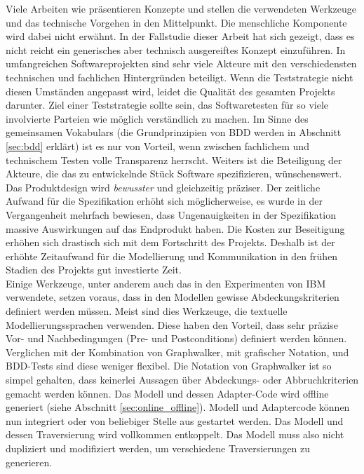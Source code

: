 Viele Arbeiten wie \cite{pretschner_one_2005} \cite{pinheiro_model-based_2013} \cite{sensler_testautomatisierung_2011} präsentieren Konzepte und stellen die verwendeten Werkzeuge und das technische Vorgehen in den Mittelpunkt. Die menschliche Komponente wird dabei nicht erwähnt. In der Fallstudie dieser Arbeit hat sich gezeigt, dass es nicht reicht ein generisches aber technisch ausgereiftes Konzept einzuführen. In umfangreichen Softwareprojekten sind sehr viele Akteure mit den verschiedensten technischen und fachlichen Hintergründen beteiligt. Wenn die Teststrategie nicht diesen Umständen angepasst wird, leidet die Qualität des gesamten Projekts darunter. Ziel einer Teststrategie sollte sein, das Softwaretesten für so viele involvierte Parteien wie möglich verständlich zu machen. Im Sinne des gemeinsamen Vokabulars (die Grundprinzipien von \Gls{BDD} werden in Abschnitt \ref{sec:bdd} erklärt) ist es nur von Vorteil, wenn zwischen fachlichem und technischem Testen volle Transparenz herrscht. Weiters ist die Beteiligung der Akteure, die das zu entwickelnde Stück Software spezifizieren, wünschenswert. Das Produktdesign wird \textit{bewusster} und gleichzeitig präziser. Der zeitliche Aufwand für die Spezifikation erhöht sich möglicherweise, es wurde in der Vergangenheit mehrfach bewiesen, dass Ungenauigkeiten in der Spezifikation massive Auswirkungen auf das Endprodukt haben. Die Kosten zur Beseitigung erhöhen sich drastisch sich mit dem Fortschritt des Projekts. Deshalb ist der erhöhte Zeitaufwand für die Modellierung und Kommunikation in den frühen Stadien des Projekts gut investierte Zeit.\\
Einige Werkzeuge, unter anderem auch das in den Experimenten von IBM \cite{farchi_using_2002} verwendete, setzen voraus, dass in den Modellen gewisse Abdeckungskriterien definiert werden müssen. Meist sind dies Werkzeuge, die textuelle Modellierungssprachen verwenden. Diese haben den Vorteil, dass sehr präzise Vor- und Nachbedingungen (Pre- und Postconditions) definiert werden können. Verglichen mit der Kombination von Graphwalker, mit grafischer Notation, und BDD-Tests sind diese weniger flexibel. Die Notation von Graphwalker ist so simpel gehalten, dass keinerlei Aussagen über Abdeckungs- oder Abbruchkriterien  gemacht werden können. Das Modell und dessen Adapter-Code wird offline generiert (siehe Abschnitt  \ref{sec:online_offline}). Modell und Adaptercode können nun integriert oder von beliebiger Stelle aus gestartet werden. Das Modell und dessen Traversierung wird vollkommen entkoppelt. Das Modell muss also nicht dupliziert und modifiziert werden, um verschiedene Traversierungen zu generieren.\\
